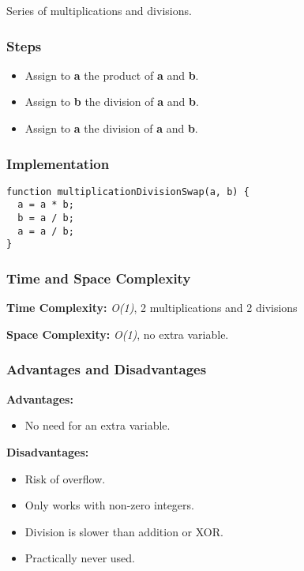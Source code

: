 Series of multiplications and divisions.

\subsubsection*{Steps}

\begin{itemize}
  \item Assign to \textbf{a} the product of \textbf{a} and \textbf{b}.
  \item Assign to \textbf{b} the division of \textbf{a} and \textbf{b}.
  \item Assign to \textbf{a} the division of \textbf{a} and \textbf{b}.
\end{itemize}

\subsubsection*{Implementation}

\begin{lstlisting}[style=general]
function multiplicationDivisionSwap(a, b) {
  a = a * b;
  b = a / b;
  a = a / b;
}
\end{lstlisting}

\subsubsection*{Time and Space Complexity}

\textbf{Time Complexity:} \textit{O(1)}, 2 multiplications and 2 divisions

\textbf{Space Complexity:} \textit{O(1)}, no extra variable.

\subsubsection*{Advantages and Disadvantages}

\textbf{Advantages:}

\begin{itemize}
  \item No need for an extra variable.
\end{itemize}

\textbf{Disadvantages:}

\begin{itemize}
  \item Risk of overflow.
  \item Only works with non-zero integers.
  \item Division is slower than addition or XOR.
  \item Practically never used.
\end{itemize}
